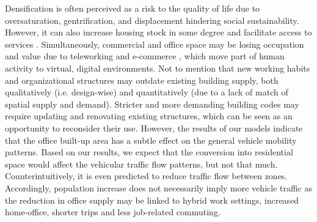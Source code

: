 Densification is often perceived as a risk to the quality of life due to oversaturation, gentrification, and displacement \citep{Rerat2010NewDebates, Chapple2017IncomeDisplacement} hindering social sustainability. However, it can also increase housing stock in some degree and facilitate access to services \citep{Neuman2005TheFallacy, Bramley2009UrbanType}. Simultaneously, commercial and office space may be losing occupation and value due to teleworking and e-commerce \citep{Le2022ImpactsReview}, which move part of human activity to virtual, digital environments. Not to mention that new working habits and organizational structures may outdate existing building supply, both qualitatively (i.e. design-wise) and quantitatively (due to a lack of match of spatial supply and demand). Stricter and more demanding building codes may require updating and renovating existing structures, which can be seen as an opportunity to reconsider their use. 
However, the results of our models indicate that the office built-up area has a subtle effect on the general vehicle mobility patterns. Based on our results, we expect that the conversion into residential space would affect the vehicular traffic flow patterns, but not that much. Counterintuitively, it is even predicted to reduce traffic flow between zones. %
Accordingly, population increase does not necessarily imply more vehicle traffic as the reduction in office supply may be linked to hybrid work settings, increased home-office, shorter trips and less job-related commuting.


